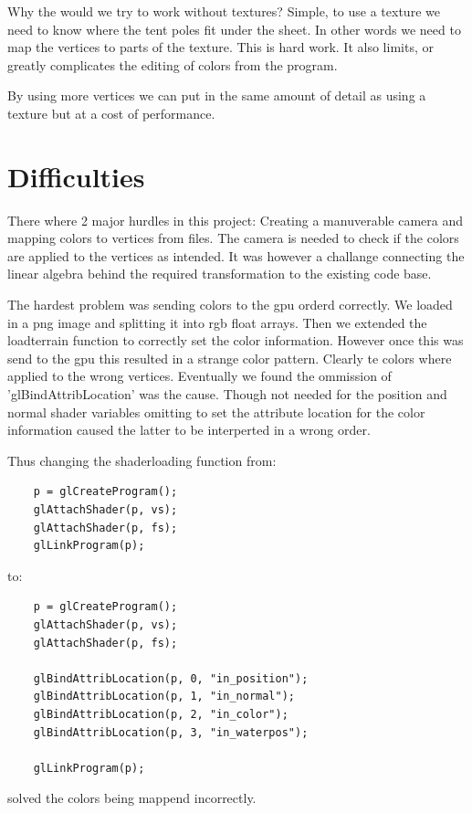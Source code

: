 \documentclass[a4paper, 11pt]{article} %
\begin{document}
Why the would we try to work without textures? Simple, to use a texture we need to know where the tent poles fit under the sheet. In other words we need to map the vertices to parts of the texture. This is hard work. It also limits, or greatly complicates the editing of colors from the program.

By using more vertices we can put in the same amount of detail as using a texture but at a cost of performance.

\section*{Difficulties}

There where 2 major hurdles in this project: Creating a manuverable camera and mapping colors to vertices from files. The camera is needed to check if the colors are applied to the vertices as intended. It was however a challange connecting the linear algebra behind the required transformation to the existing code base.

The hardest problem was sending colors to the gpu orderd correctly. We loaded in a png image and splitting it into rgb float arrays. Then we extended the loadterrain function to correctly set the color information. However once this was send to the gpu this resulted in a strange color pattern. Clearly te colors where applied to the wrong vertices. Eventually we found the ommission of 'glBindAttribLocation' was the cause. Though not needed for the position and normal shader variables omitting to set the attribute location for the color information caused the latter to be interperted in a wrong order.

Thus changing the shaderloading function from:
\begin{lstlisting}
	p = glCreateProgram();
	glAttachShader(p, vs);
	glAttachShader(p, fs);
	glLinkProgram(p);
\end{lstlisting}

to:
\begin{lstlisting}
	p = glCreateProgram();
	glAttachShader(p, vs);
	glAttachShader(p, fs);

	glBindAttribLocation(p, 0, "in_position");
	glBindAttribLocation(p, 1, "in_normal");
	glBindAttribLocation(p, 2, "in_color");
	glBindAttribLocation(p, 3, "in_waterpos");

	glLinkProgram(p);
\end{lstlisting}
solved the colors being mappend incorrectly.
\end{document}
